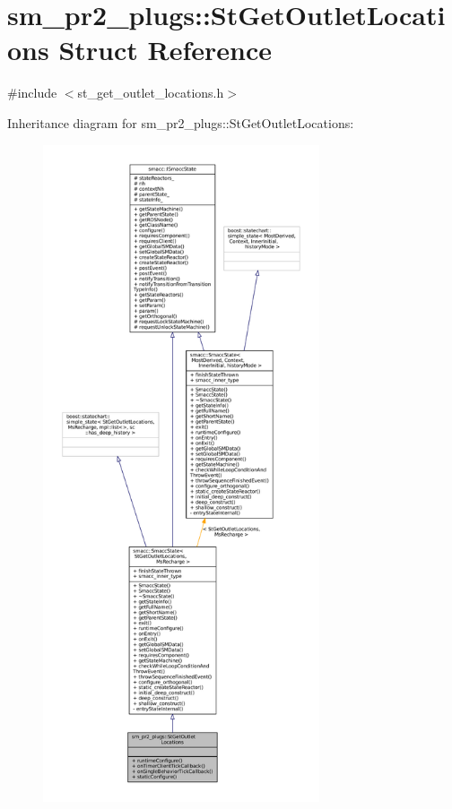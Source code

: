 \hypertarget{structsm__pr2__plugs_1_1StGetOutletLocations}{}\section{sm\+\_\+pr2\+\_\+plugs\+:\+:St\+Get\+Outlet\+Locations Struct Reference}
\label{structsm__pr2__plugs_1_1StGetOutletLocations}


{\ttfamily \#include $<$st\+\_\+get\+\_\+outlet\+\_\+locations.\+h$>$}



Inheritance diagram for sm\+\_\+pr2\+\_\+plugs\+:\+:St\+Get\+Outlet\+Locations\+:
\nopagebreak
\begin{figure}[H]
\begin{center}
\leavevmode
\includegraphics[height=550pt]{structsm__pr2__plugs_1_1StGetOutletLocations__inherit__graph}
\end{center}
\end{figure}


